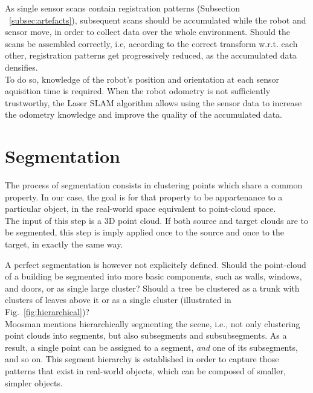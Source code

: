 As single sensor scans contain registration patterns (Subsection ~\ref{subsec:artefacts}), subsequent scans should be accumulated while the robot and sensor move, in order to collect data over the whole environment. Should the scans be assembled correctly, i.e, according to the correct transform w.r.t. each other, registration patterns get progressively reduced, as the accumulated data densifies.\\

To do so, knowledge of the robot's position and orientation at each sensor aquisition time is required. When the robot odometry is not sufficiently trustworthy, the Laser SLAM algorithm allows using the sensor data to increase the odometry knowledge and improve the quality of the accumulated data.\\

\section{Segmentation}
\label{sec:segmentation}

The process of segmentation consists in clustering points which share a common property. In our case, the goal is for that property to be appartenance to a particular object, in the real-world space equivalent to point-cloud space.\\

The input of this step is a 3D point cloud. If both source and target clouds are to be segmented, this step is imply applied once to the source and once to the target, in exactly the same way.

A perfect segmentation is however not explicitely defined. Should the point-cloud of a building be segmented into more basic components, such as walls, windows, and doors, or as single large cluster? Should a tree be clustered as a trunk with clusters of leaves above it or as a single cluster (illustrated in Fig.~\ref{fig:hierarchical})?\\

Moosman \cite{moosmann2011unsupervised} mentions hierarchically segmenting the scene, i.e., not only clustering point clouds into segments, but also subsegments and subsubsegments. As a result, a single point can be assigned to a segment, \textit{and} one of its subsegments, and so on. This segment hierarchy is established in order to capture those patterns that exist in real-world objects, which can be composed of smaller, simpler objects.\\

